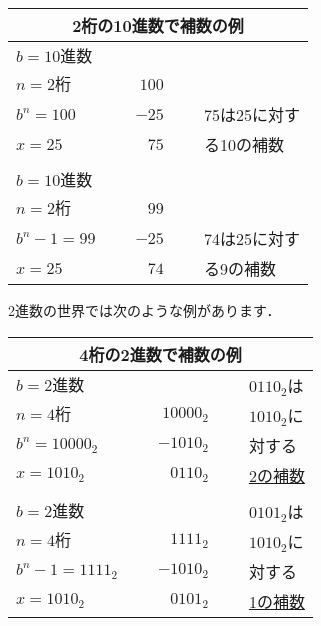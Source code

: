 \begin{center}
\begin{tabular}{| l c r c l |}
\hline
\multicolumn{5}{|c|}{\bf 2桁の10進数で補数の例} \\
\hline
$b=10進数$    & ~ &       &   &              \\
$n=2桁$       & ~ & $100$ &   &              \\
$b^n = 100$   & ~ & $-25$ & ~ & 75は25に対す \\
\cline{3-3}
$x = 25$      &   &  $75$ &   & る10の補数   \\
              &   &       &   &        \\
$b=10進数$    & ~ &       &   &              \\
$n=2桁$       & ~ &  $99$ &   &              \\
$b^n-1 = 99$  & ~ & $-25$  & ~ & 74は25に対す \\
\cline{3-3}
$x = 25$      &   &  $74$ &   & る9の補数   \\
\hline
\end{tabular}
\end{center}

2進数の世界では次のような例があります．

\begin{center}
\begin{tabular}{| l c r c l |}
\hline
\multicolumn{5}{|c|}{\bf 4桁の2進数で補数の例} \\
\hline
$b=2進数$       & ~ &          &   & $0110_2$は  \\ 
$n=4桁$         & ~ & $10000_2$ &   & $1010_2$に  \\
$b^n = 10000_2$ & ~ & $-1010_2$ & ~ & 対する      \\
\cline{3-3}
$x = 1010_2$    &   & $0110_2$  &   & \underline{2の補数} \\ 
                &   &           &   &            \\
$b=2進数$       & ~ &           &   & $0101_2$は \\
$n=4桁$         & ~ & $1111_2$  &   & $1010_2$に \\
$b^n-1 = 1111_2$& ~ & $-1010_2$  & ~ & 対する      \\
\cline{3-3}
$x = 1010_2$    &   & $0101_2$  &   & \underline{1の補数} \\
\hline
\end{tabular}
\end{center}

